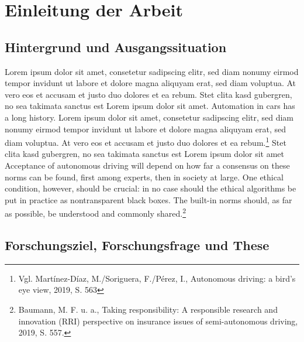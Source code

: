 \chapter{Einleitung der Arbeit}

\section{Hintergrund und Ausgangssituation}

Lorem ipsum dolor sit amet, consetetur sadipscing elitr, sed diam nonumy eirmod tempor invidunt ut labore et dolore magna aliquyam erat, sed diam voluptua. 
At vero eos et accusam et justo duo dolores et ea rebum. 
Stet clita kasd gubergren, no sea takimata sanctus est Lorem ipsum dolor sit amet. 
Automation in cars has a long history.  Lorem ipsum dolor sit amet, consetetur sadipscing elitr, sed diam nonumy eirmod tempor invidunt ut labore et dolore magna aliquyam erat, sed diam voluptua. 
At vero eos et accusam et justo duo dolores et ea rebum.\footnote{Vgl. Martínez-Díaz, M./Soriguera, F./Pérez, I., Autonomous driving: a bird's eye view, 2019, S. 563} 
Stet clita kasd gubergren, no sea takimata sanctus est Lorem ipsum dolor sit amet Acceptance of autonomous driving will depend on how far a consensus on these norms can be found, first among experts, then in society at large. 
One ethical condition, however, should be crucial: in no case should the ethical algorithms be put in practice as nontransparent black boxes. 
The built-in norms should, as far as possible, be understood and commonly shared.\footnote{Baumann, M. F. u. a., Taking responsibility: A responsible research and innovation (RRI) perspective on insurance issues of semi-autonomous driving, 2019, S. 557.}
\section{Forschungsziel, Forschungsfrage und These}

